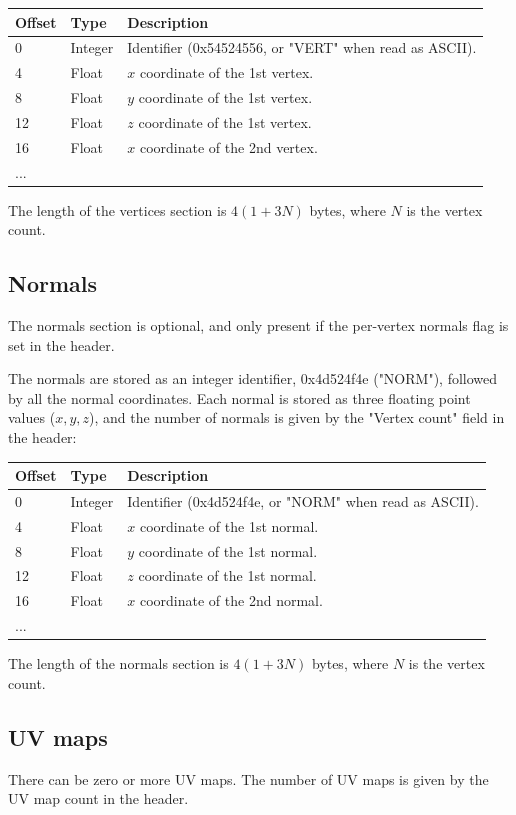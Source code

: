 \begin{tabular}{|l|l|l|}\hline
\textbf{Offset} &  \textbf{Type} & \textbf{Description}\\ \hline
0 & Integer & Identifier (0x54524556, or "VERT" when read as ASCII).\\ \hline
4 & Float & $x$ coordinate of the 1st vertex.\\ \hline
8 & Float & $y$ coordinate of the 1st vertex.\\ \hline
12 & Float & $z$ coordinate of the 1st vertex.\\ \hline
16 & Float & $x$ coordinate of the 2nd vertex.\\ \hline
... & & \\ \hline
\end{tabular}

The length of the vertices section is $4(1+3N)$ bytes, where $N$ is the vertex
count.

\subsection{Normals}
The normals section is optional, and only present if the per-vertex normals
flag is set in the header.

The normals are stored as an integer identifier, 0x4d524f4e ("NORM"), followed
by all the normal coordinates. Each normal is stored as three floating point
values ($x,y,z$), and the number of normals is given by the "Vertex count" field
in the header:

\begin{tabular}{|l|l|l|}\hline
\textbf{Offset} &  \textbf{Type} & \textbf{Description}\\ \hline
0 & Integer & Identifier (0x4d524f4e, or "NORM" when read as ASCII).\\ \hline
4 & Float & $x$ coordinate of the 1st normal.\\ \hline
8 & Float & $y$ coordinate of the 1st normal.\\ \hline
12 & Float & $z$ coordinate of the 1st normal.\\ \hline
16 & Float & $x$ coordinate of the 2nd normal.\\ \hline
... & & \\ \hline
\end{tabular}

The length of the normals section is $4(1+3N)$ bytes, where $N$ is the vertex
count.

\subsection{UV maps}
There can be zero or more UV maps. The number of UV maps is given by the
UV map count in the header.


